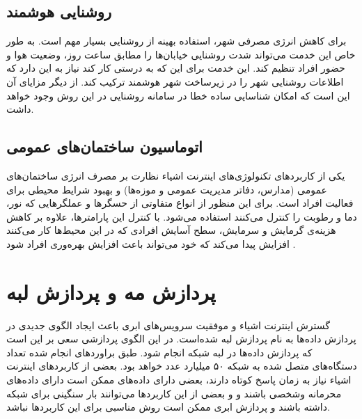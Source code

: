     \subsection{روشنایی هوشمند}
      برای کاهش انرژی مصرفی شهر، استفاده بهینه از روشنایی بسیار مهم است.
      به طور خاص این خدمت می‌تواند شدت روشنایی خیابان‌ها را مطابق ساعت روز، وضعیت هوا و حضور افراد تنظیم کند.
      این خدمت برای این که به درستی کار کند نیاز به این دارد که اطلاعات روشنایی شهر را در زیرساخت شهر هوشمند ترکیب کند.
      از دیگر مزایای آن این است که امکان شناسایی ساده خطا در سامانه روشنایی در این روش وجود خواهد داشت.

    \subsection{اتوماسیون ساختمان‌های عمومی}
      یکی از کاربرد‌های تکنولوژی‌های اینترنت اشیاء نظارت بر مصرف انرژی ساختمان‌های عمومی (مدارس، دفاتر مدیریت عمومی و موزه‌ها) و بهبود شرایط محیطی برای فعالیت افراد است.
      برای این منظور از انواع متفاوتی از حسگر‌ها و عملگر‌هایی که نور، دما و رطوبت را کنترل می‌کنند استفاده می‌شود.
      با کنترل این پارامتر‌ها، علاوه بر کاهش هزینه‌ی گرمایش و سرمایش، سطح آسایش افرادی که در این محیط‌ها کار می‌کنند افزایش پیدا می‌کند که خود می‌تواند باعث افزایش بهره‌وری افراد شود \cite{lee2008intelligent}.

  \section{پردازش مه و پردازش لبه}
    گسترش اینترنت اشیاء و موفقیت سرویس‌های ابری باعث ایجاد الگو‌ی جدیدی در پردازش داده‌ها به نام پردازش لبه  شده‌است.
    در این الگوی پردازشی سعی بر این است که پردازش داده‌ها در لبه شبکه انجام شود.
    طبق براورد‌های انجام شده \cite{2018cisco} تعداد دستگاه‌های متصل شده به شبکه ۵۰ میلیارد عدد خواهد بود.
    بعضی از کاربردهای اینترنت اشیاء نیاز به زمان پاسخ کوتاه دارند، بعضی دارای داده‌های ممکن است دارای داده‌های محرمانه وشخصی باشند و و بعضی از این کاربرد‌ها می‌توانند بار سنگینی برای شبکه داشته باشند و پردازش ابری ممکن است روش مناسبی برای این کاربرد‌ها نباشد.

